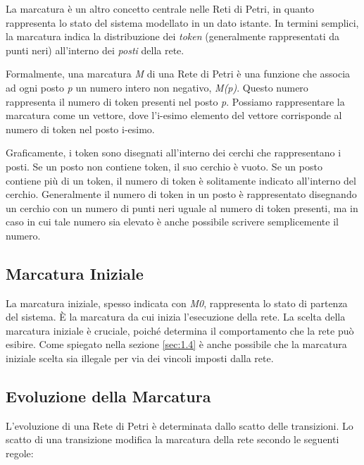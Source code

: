 La marcatura è un altro concetto centrale nelle Reti di Petri, in quanto rappresenta lo stato del sistema modellato in un dato istante. In termini semplici, la marcatura indica la distribuzione dei \textit{token} (generalmente rappresentati da punti neri) all'interno dei \textit{posti} della rete.

Formalmente, una marcatura \textit{M} di una Rete di Petri è una funzione che associa ad ogni posto \textit{p} un numero intero non negativo, \textit{M(p)}. Questo numero rappresenta il numero di token presenti nel posto \textit{p}. Possiamo rappresentare la marcatura come un vettore, dove l'i-esimo elemento del vettore corrisponde al numero di token nel posto i-esimo.

Graficamente, i token sono disegnati all'interno dei cerchi che rappresentano i posti. Se un posto non contiene token, il suo cerchio è vuoto. Se un posto contiene più di un token, il numero di token è solitamente indicato all'interno del cerchio. Generalmente il numero di token in un posto è rappresentato disegnando un cerchio con un numero di punti neri uguale al numero di token presenti, ma in caso in cui tale numero sia elevato è anche possibile scrivere semplicemente il numero.

\subsection{Marcatura Iniziale}
La marcatura iniziale, spesso indicata con \textit{M0}, rappresenta lo stato di partenza del sistema. È la marcatura da cui inizia l'esecuzione della rete. La scelta della marcatura iniziale è cruciale, poiché determina il comportamento che la rete può esibire. Come spiegato nella sezione \ref{sec:1.4} è anche possibile che la marcatura iniziale scelta sia illegale per via dei vincoli imposti dalla rete.

\subsection{Evoluzione della Marcatura}
L'evoluzione di una Rete di Petri è determinata dallo scatto delle transizioni. Lo scatto di una transizione modifica la marcatura della rete secondo le seguenti regole:

